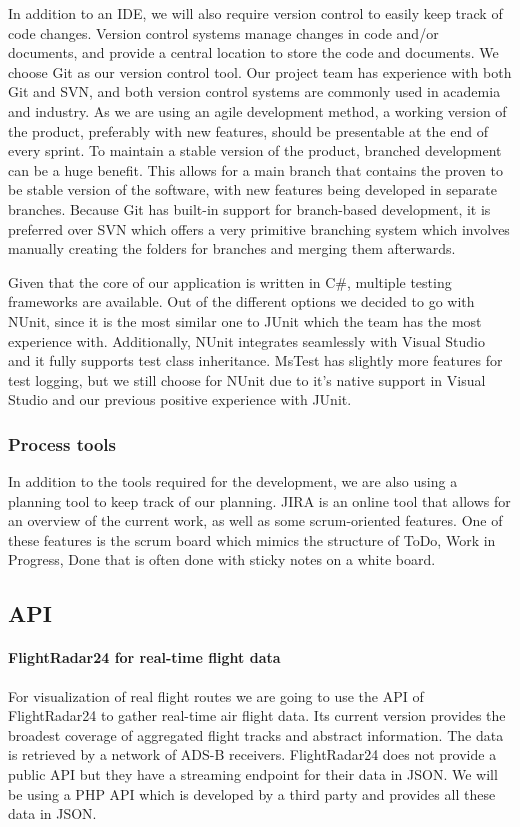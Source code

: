 In addition to an IDE, we will also require version control to easily keep track of code changes. Version control systems manage changes in code and/or documents, and provide a central location to store the code and documents. We choose Git as our version control tool. Our project team has experience with both Git and SVN, and both version control systems are commonly used in academia and industry. As we are using an agile development method, a working version of the product, preferably with new features, should be presentable at the end of every sprint. To maintain a stable version of the product, branched development can be a huge beneﬁt. This allows for a main branch that contains the proven to be stable version of the software, with new features being developed in separate branches. Because Git has built-in support for branch-based development, it is preferred over SVN which oﬀers a very primitive branching system which involves manually creating the folders for branches and merging them afterwards.

Given that the core of our application is written in C\#, multiple testing frameworks are available. Out of the diﬀerent options we decided to go with NUnit, since it is the most similar one to JUnit  which the team has the most experience with. Additionally, NUnit integrates seamlessly with Visual Studio and it fully supports test class inheritance. MsTest has slightly more features for test logging, but we still choose for NUnit due to it’s native support in Visual Studio and our previous positive experience with JUnit.

\subsubsection{Process tools}

In addition to the tools required for the development, we are also using a planning tool to keep track of our planning. JIRA is an online tool that allows for an overview of the current work, as well as some scrum-oriented features. One of these features is the scrum board which mimics the structure of ToDo, Work in Progress, Done that is often done with sticky notes on a white board. 

\subsection{API}

\paragraph{FlightRadar24 for real-time flight data}
For visualization of real flight routes we are going to use the API of FlightRadar24 to gather real-time air flight data. Its current version provides the broadest coverage of aggregated flight tracks and abstract information. The data is retrieved by a network of ADS-B receivers. FlightRadar24 does not provide a public API but they have a streaming endpoint for their data in JSON. We will be using a PHP API which is developed by a third party and provides all these data in JSON.

